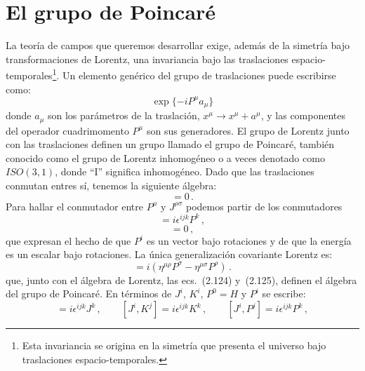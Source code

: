 \documentclass[a4paper,11pt]{book} %
\begin{document}
\section{El grupo de Poincaré}
\noindent
La teoría de campos que queremos desarrollar exige, además de la simetría bajo transformaciones de Lorentz, una invariancia bajo las traslaciones espacio-temporales\footnote{Esta invariancia se origina en la simetría que presenta el universo bajo traslaciones espacio-temporales.}. Un elemento genérico del grupo
de traslaciones puede escribirse como:
\begin{equation}
\exp\{-iP^{\mu}a_{\mu}\}
\end{equation}
\noindent
donde $a_{\mu}$ son los parámetros de la traslación,
$x^{\mu}\rightarrow x^{\mu}+a^{\mu}$, y las componentes del operador
cuadrimomento $P^{\mu}$ son sus generadores. 
\medskip\newline
El grupo de Lorentz junto con las traslaciones definen un grupo llamado el grupo de Poincaré, también conocido como el
grupo de Lorentz inhomogéneo o a veces denotado como $ISO(3,1)$, donde ``I''
significa inhomogéneo.
\medskip\newline
Dado que las traslaciones conmutan entres sí, tenemos la siguiente álgebra:
\begin{equation}
[P^{\mu},P^{\nu}]=0\,.
\end{equation}
\noindent
Para hallar el conmutador entre $P^{\mu}$ y $J^{\rho\sigma}$ podemos partir de
los conmutadores
\begin{equation}
[J^{i},P^{j}]=i\epsilon^{ijk}P^{k}\,,
\end{equation}
\begin{equation}
[J^{i},P^{0}]=0\,,
\end{equation}
\noindent
que expresan el hecho de que $P^{i}$ es un vector bajo rotaciones y de que la
energía es un escalar bajo rotaciones. 
\medskip\newline
La única generalización covariante
Lorentz es:
\begin{equation}
[P^{\mu},J^{\rho\sigma}]=i\left(\eta^{\mu\rho}P^{\sigma}-\eta^{\mu\sigma}P^{\rho}\right)\,.
\end{equation}
\noindent
que, junto con el álgebra de Lorentz, las ecs.~(2.124) y~(2.125), definen el álgebra del grupo de Poincaré. 
\medskip\newline
En términos de $J^{i}$, $K^{i}$, $P^{0}=H$ y $P^{i}$ se
escribe:
\begin{equation}
[J^{i},J^{j}]=i\epsilon^{ijk}J^{k}\,,\qquad
[J^{i},K^{j}]=i\epsilon^{ijk}K^{k}\,,\qquad
[J^{i},P^{j}]=i\epsilon^{ijk}P^{k}\,,
\end{equation}
\end{document}
